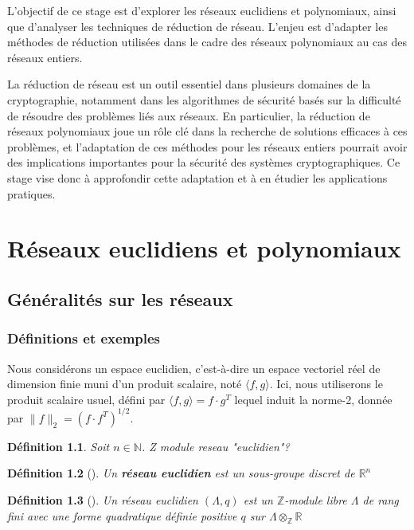 \documentclass[a4paper,12pt]{report}  %
\theoremstyle{definitionstyle}
\newtheorem{definition}{Définition}[chapter] %
\theoremstyle{examplestyle}
\theoremstyle{remarkstyle}
\theoremstyle{propositionstyle}
\begin{document}
	L'objectif de ce stage est d'explorer les réseaux euclidiens et polynomiaux, ainsi que d'analyser les techniques de réduction de réseau. L'enjeu est d'adapter les méthodes de réduction utilisées dans le cadre des réseaux polynomiaux au cas des réseaux entiers.
	
	La réduction de réseau est un outil essentiel dans plusieurs domaines de la cryptographie, notamment dans les algorithmes de sécurité basés sur la difficulté de résoudre des problèmes liés aux réseaux. En particulier, la réduction de réseaux polynomiaux joue un rôle clé dans la recherche de solutions efficaces à ces problèmes, et l'adaptation de ces méthodes pour les réseaux entiers pourrait avoir des implications importantes pour la sécurité des systèmes cryptographiques. Ce stage vise donc à approfondir cette adaptation et à en étudier les applications pratiques.	
	
	\chapter{Réseaux euclidiens et polynomiaux}
	
	\section{Généralités sur les réseaux}
	\subsection{Définitions et exemples}
	Nous considérons un espace euclidien, c'est-à-dire un espace vectoriel réel de dimension finie muni d'un produit scalaire, noté $\langle f, g \rangle$. Ici, nous utiliserons le produit scalaire usuel, défini par $\langle f, g \rangle = f \cdot g^T$ lequel induit la norme-2, donnée par $\|f\|_2=(f \cdot f^T)^{1/2}$.
	
	\begin{definition}%
		Soit $n \in \mathbb{N}$. Z module reseau "euclidien"?
	\end{definition}

	\begin{definition}[\cite{clef_unique_1}]
		Un \textbf{réseau euclidien} est un sous-groupe discret de $\mathbb{R}^n$
	\end{definition}


	\begin{definition}[\cite{clef_unique_2}]
		Un réseau euclidien $(\Lambda, q)$ est un $\mathbb{Z}$-module libre $\Lambda$ de rang fini avec une forme quadratique définie positive $q$ sur $\Lambda \otimes_\mathbb{Z} \mathbb{R}$ 
	\end{definition}
	
\end{document}
